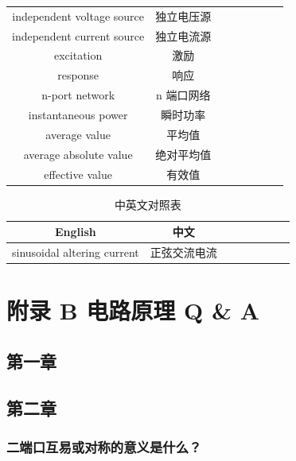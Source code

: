 \documentclass[UTF8]{report}
\theoremstyle{MyLineTheoremStyle} %
\theoremstyle{MyBlockTheoremStyle} %
\theoremstyle{MySubsubsectionStyle} %
\begin{document}
\begin{multicols}{2}
\begin{table}[H]
\begin{tabular}{cccccccc}
    independent voltage source & 独立电压源 \\ 
    independent current source & 独立电流源 \\ 
    excitation & 激励 \\
    response & 响应 \\
    n-port network & n 端口网络 \\
    instantaneous power & 瞬时功率 \\
    average value & 平均值 \\
    average absolute value & 绝对平均值 \\
    effective value & 有效值 \\
    \bottomrule
\end{tabular}
\end{table}

\begin{table}[H]\centering
    \caption{中英文对照表}
    \begin{tabular}{cccccccc}\toprule
        English & 中文 \\
        \midrule
        sinusoidal altering current & 正弦交流电流 \\
        \bottomrule
    \end{tabular}
\end{table}

\end{multicols} 

\chapter*{附录 B\hspace*{20pt} 电路原理 Q \& A}\setcounter{chapter}{2} 
\setcounter{equation}{0}    %
\thispagestyle{fancy} 
\setcounter{section}{0}   
\setcounter{chapter}{1} 
\renewcommand\thesection{B.\arabic{section}}   
\renewcommand{\thefigure}{B.\arabic{figure}} 
\renewcommand{\thetable}{B.\arabic{table}}

\section{第一章}

\section{第二章}

\subsection{二端口互易或对称的意义是什么？}
\end{document}
